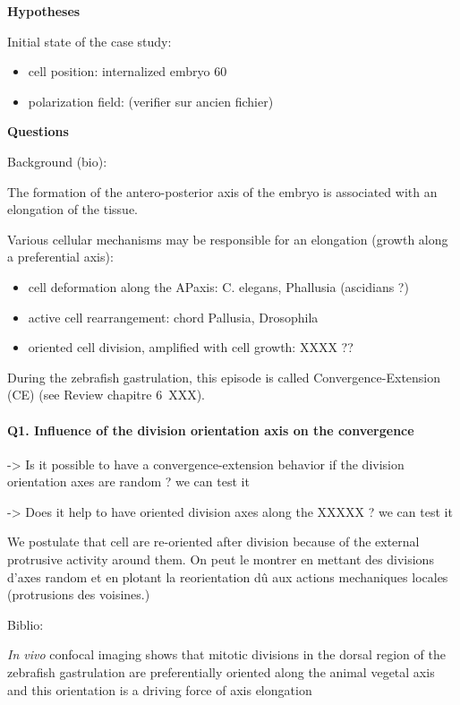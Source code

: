 \textbf{Hypotheses}

  Initial state of the case study: 
\begin{itemize}
	\item cell position: internalized embryo 60%
	\item polarization field: (verifier sur ancien fichier)
\end{itemize}

\textbf{Questions}

  Background (bio): 

  The formation of the antero-posterior axis of the embryo is associated with an elongation of the tissue. 

  Various cellular mechanisms may be responsible for an elongation (growth along a preferential axis): 
\begin{itemize}
	\item cell deformation along the APaxis: C. elegans, Phallusia (ascidians ?)
	\item active cell rearrangement: chord Pallusia, Drosophila
	\item oriented cell division, amplified with cell growth: XXXX ??
\end{itemize}

  During the zebrafish gastrulation, this episode is called Convergence-Extension (CE) (see Review chapitre 6 XXX). 

\paragraph{Q1. Influence of the division orientation axis on the convergence}

  -> Is it possible to have a convergence-extension behavior if the division orientation axes are random ? we can test it 

  -> Does it help to have oriented division axes along the XXXXX ? we can test it 

  We postulate that cell are re-oriented after division because of the external protrusive activity around them. On peut le montrer en mettant des divisions d'axes random et en plotant la reorientation dû aux actions mechaniques locales (protrusions des voisines.) 

  Biblio: 

\textit{In vivo} confocal imaging shows that mitotic divisions in the dorsal region of the zebrafish gastrulation are preferentially oriented along the animal vegetal axis and this orientation is a driving force of axis elongation \cite{Gong:2004bw}

